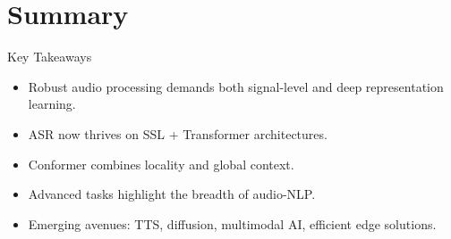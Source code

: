 \section{Summary}

\begin{frame}{Key Takeaways}
    \begin{itemize}
        \setlength{\itemsep}{1.5em}
        \item Robust audio processing demands both signal-level and deep representation learning.
        \item ASR now thrives on SSL + Transformer architectures.
        \item Conformer combines locality and global context.
        \item Advanced tasks highlight the breadth of audio-NLP.
        \item Emerging avenues: TTS, diffusion, multimodal AI, efficient edge solutions.
    \end{itemize}
\end{frame}
